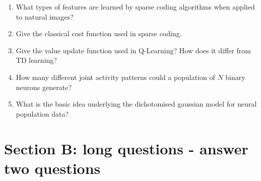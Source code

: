 \documentclass{article}
\newif\ifanswer
\begin{document}
\begin{enumerate}
  \ifanswer \textbf{Answer}: The existence of a teacher (or teaching signal) in supervised learning, and a reward signal in reinforcement learning.\\
  \fi
  
  
\item What types of features are learned by sparse coding algorithms when applied to natural images?

  \ifanswer \textbf{Answer}: Features representing statistics of natural images, such as oriented bars/edges.\\
  \fi
  
\item Give the classical cost function used in sparse coding.

  \ifanswer \textbf{Answer}: $\mathrm{cost} = \Vert U - WV \Vert_2^2 + \lambda \Vert V\Vert_1$, where $V$ is the activity of output neurons and $U$ is the input activity of input neurons. The second term enforces sparsity.\\
  \fi
  
\item Give the value update function used in Q-Learning? How does it differ from TD learning?

  \ifanswer \textbf{Answer}: $\underbrace{Q(S_t, A_t)}_{\mathrm{value}} = Q(S_t, A_t) + (\overbrace{\underbrace{R_{t+1}}_{\mathrm{reward}}+\lambda \underbrace{\mathrm{max}_a Q(S_{t+1},a)}_{\mathrm{future\:value}}}^{\mathrm{learned\:value}}-Q_{t}(S_t,A_t))$. It differs from TD learning in that it takes the action with maximal value for the update, which makes Q-learning an off-policy method.\\
  \fi

\item How many different joint activity patterns could a population of $N$ binary neurons generate?

\ifanswer \textbf{answer to appear} \fi
  
\item What is the basic idea underlying the dichotomised gaussian model for neural population data?

  \ifanswer \textbf{answer to appear}
  \fi

\end{enumerate}
  
\section*{Section B: long questions - answer two questions}
\end{document}
